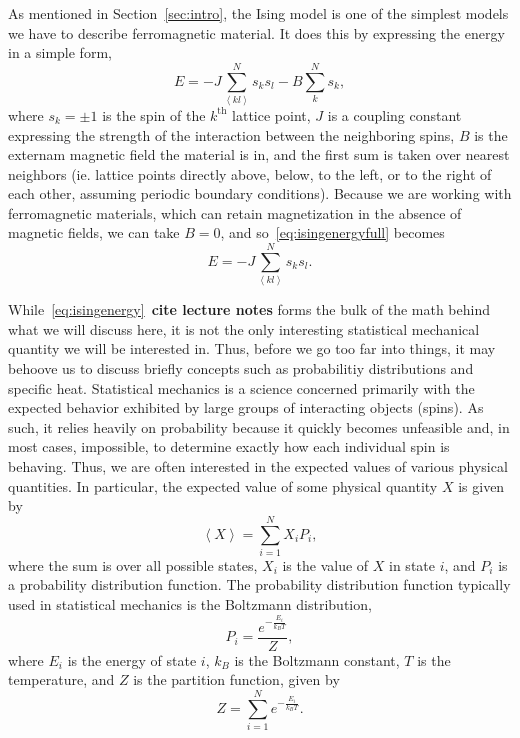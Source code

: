 \documentclass[12pt]{article}
\numberwithin{equation}{section}
\begin{document}
As mentioned in Section~\ref{sec:intro}, the Ising model is one of the simplest models we have to describe ferromagnetic material.  It does this by expressing the energy in a simple form,
\begin{equation}
\label{eq:isingenergyfull}
E = -J\sum_{\left<kl\right>}^{N}s_{k}s_{l}-B\sum_{k}^{N}s_{k},
\end{equation}
where $s_{k}=\pm1$ is the spin of the $k^{\text{th}}$ lattice point, $J$ is a coupling constant expressing the strength of the interaction between the neighboring spins, $B$ is the externam magnetic field the material is in, and the first sum is taken over nearest neighbors (ie. lattice points directly above, below, to the left, or to the right of each other, assuming periodic boundary conditions).  Because we are working with ferromagnetic materials, which can retain magnetization in the absence of magnetic fields, we can take $B=0$, and so~\eqref{eq:isingenergyfull} becomes
\begin{equation}
\label{eq:isingenergy}
E = -J\sum_{\left<kl\right>}^{N}s_{k}s_{l}.
\end{equation}
\par While~\eqref{eq:isingenergy}~\textbf{cite lecture notes} forms the bulk of the math behind what we will discuss here, it is not the only interesting statistical mechanical quantity we will be interested in.  Thus, before we go too far into things, it may behoove us to discuss briefly concepts such as probabilitiy distributions and specific heat.  Statistical mechanics is a science concerned primarily with the expected behavior exhibited by large groups of interacting objects (spins).  As such, it relies heavily on probability because it quickly becomes unfeasible and, in most cases, impossible, to determine exactly how each individual spin is behaving.  Thus, we are often interested in the expected values of various physical quantities.  In particular, the expected value of some physical quantity $X$ is given by 
\begin{equation}
\label{eq:expvaldef}
\left<X\right>=\sum_{i=1}^{N}X_{i}P_{i},
\end{equation}
where the sum is over all possible states, $X_{i}$ is the value of $X$ in state $i$, and $P_{i}$ is a probability distribution function.  The probability distribution function typically used in statistical mechanics is the Boltzmann distribution, 
\begin{equation}
\label{eq:boltzmann}
P_{i} = \frac{e^{-\frac{E_{i}}{k_{B}T}}}{Z},
\end{equation}
where $E_{i}$ is the energy of state $i$, $k_{B}$ is the Boltzmann constant, $T$ is the temperature, and $Z$ is the partition function, given by
\begin{equation}
\label{eq:partition}
Z=\sum_{i=1}^{N}e^{-\frac{E_{i}}{k_{B}T}}.
\end{equation}
\end{document}
